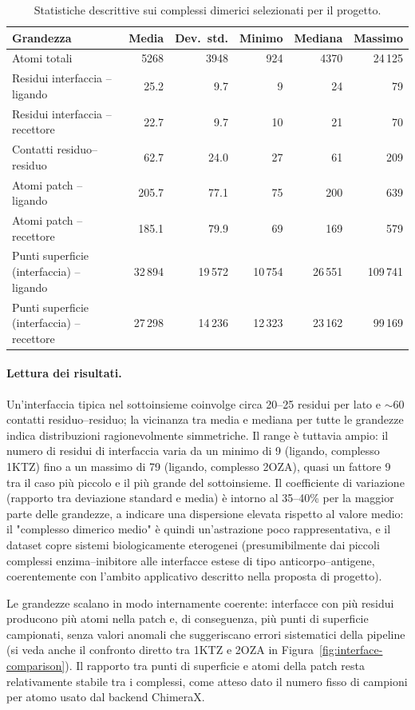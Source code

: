 \documentclass[11pt,a4paper]{article}
\begin{document}
\begin{table}[h]
\centering
\caption{Statistiche descrittive sui complessi dimerici selezionati per il progetto.}
\label{tab:stats}
\begin{tabular}{lrrrrr}
\toprule
Grandezza & Media & Dev.\ std. & Minimo & Mediana & Massimo \\
\midrule
Atomi totali & 5268 & 3948 & 924 & 4370 & 24\,125 \\
Residui interfaccia -- ligando & 25.2 & 9.7 & 9 & 24 & 79 \\
Residui interfaccia -- recettore & 22.7 & 9.7 & 10 & 21 & 70 \\
Contatti residuo--residuo & 62.7 & 24.0 & 27 & 61 & 209 \\
Atomi patch -- ligando & 205.7 & 77.1 & 75 & 200 & 639 \\
Atomi patch -- recettore & 185.1 & 79.9 & 69 & 169 & 579 \\
Punti superficie (interfaccia) -- ligando & 32\,894 & 19\,572 & 10\,754 & 26\,551 & 109\,741 \\
Punti superficie (interfaccia) -- recettore & 27\,298 & 14\,236 & 12\,323 & 23\,162 & 99\,169 \\
\bottomrule
\end{tabular}
\end{table}

\paragraph{Lettura dei risultati.} Un'interfaccia tipica nel sottoinsieme coinvolge circa 20--25 residui per lato e $\sim$60 contatti residuo--residuo; la vicinanza tra media e mediana per tutte le grandezze indica distribuzioni ragionevolmente simmetriche. Il range è tuttavia ampio: il numero di residui di interfaccia varia da un minimo di 9 (ligando, complesso 1KTZ) fino a un massimo di 79 (ligando, complesso 2OZA), quasi un fattore 9 tra il caso più piccolo e il più grande del sottoinsieme. Il coefficiente di variazione (rapporto tra deviazione standard e media) è intorno al 35--40\% per la maggior parte delle grandezze, a indicare una dispersione elevata rispetto al valore medio: il "complesso dimerico medio" è quindi un'astrazione poco rappresentativa, e il dataset copre sistemi biologicamente eterogenei (presumibilmente dai piccoli complessi enzima--inibitore alle interfacce estese di tipo anticorpo--antigene, coerentemente con l'ambito applicativo descritto nella proposta di progetto).

Le grandezze scalano in modo internamente coerente: interfacce con più residui producono più atomi nella patch e, di conseguenza, più punti di superficie campionati, senza valori anomali che suggeriscano errori sistematici della pipeline (si veda anche il confronto diretto tra 1KTZ e 2OZA in Figura~\ref{fig:interface-comparison}). Il rapporto tra punti di superficie e atomi della patch resta relativamente stabile tra i complessi, come atteso dato il numero fisso di campioni per atomo usato dal backend ChimeraX.
\end{document}

